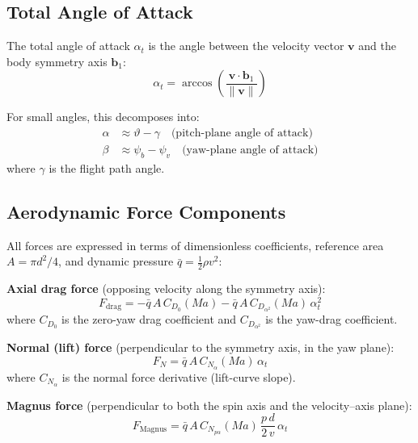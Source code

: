 \documentclass[11pt,twoside,openright]{report}
\newcommand{\vvec}{\bm{v}}
\newcommand{\Mach}{\mathit{Ma}}
\begin{document}
\subsection{Total Angle of Attack}

The total angle of attack $\alpha_t$ is the angle between the velocity vector $\vvec$ and the body symmetry axis $\bm{b}_1$:
\begin{equation}
  \alpha_t = \arccos\left(\frac{\vvec \cdot \bm{b}_1}{\|\vvec\|}\right)
  \label{eq:total_aoa}
\end{equation}

For small angles, this decomposes into:
\begin{align}
  \alpha &\approx \vartheta - \gamma \quad \text{(pitch-plane angle of attack)} \\
  \beta  &\approx \psi_b - \psi_v \quad \text{(yaw-plane angle of attack)}
\end{align}
where $\gamma$ is the flight path angle.

\subsection{Aerodynamic Force Components}

All forces are expressed in terms of dimensionless coefficients, reference area $A = \pi d^2/4$, and dynamic pressure $\bar{q} = \frac{1}{2}\rho v^2$:

\textbf{Axial drag force} (opposing velocity along the symmetry axis):
\begin{equation}
  F_{\mathrm{drag}} = -\bar{q}\,A\,C_{D_0}(\Mach) - \bar{q}\,A\,C_{D_{\alpha^2}}(\Mach)\,\alpha_t^2
  \label{eq:6dof_drag}
\end{equation}
where $C_{D_0}$ is the zero-yaw drag coefficient and $C_{D_{\alpha^2}}$ is the yaw-drag coefficient.

\textbf{Normal (lift) force} (perpendicular to the symmetry axis, in the yaw plane):
\begin{equation}
  F_N = \bar{q}\,A\,C_{N_\alpha}(\Mach)\,\alpha_t
  \label{eq:6dof_lift}
\end{equation}
where $C_{N_\alpha}$ is the normal force derivative (lift-curve slope).

\textbf{Magnus force} (perpendicular to both the spin axis and the velocity--axis plane):
\begin{equation}
  F_{\mathrm{Magnus}} = \bar{q}\,A\,C_{N_{p\alpha}}(\Mach)\,\frac{p\,d}{2\,v}\,\alpha_t
  \label{eq:6dof_magnus_force}
\end{equation}
\end{document}
